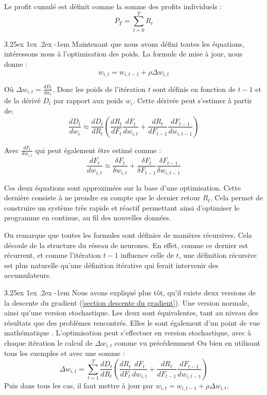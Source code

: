 \documentclass[a4paper, 11pt]{article}
\makeatletter
\renewcommand\paragraph{\@startsection{paragraph}{5}{\z@}%
  {3.25ex \@plus1ex \@minus.2ex}%
  {-1em}%
  {\normalfont\normalsize\bfseries}}
\makeatother
\begin{document}
Le profit cumulé est définit comme la somme des profits individuels :
$$P_T = \sum_{t=0}^T R_t$$

\paragraph{}
Maintenant que nous avons défini toutes les équations, intéressons nous à l'optimisation des poids. La formule de mise à jour, nous donne :
$$w_{i,t} = w_{i,t-1} + \rho \Delta w_{i,t}$$

Où $\Delta w_{i,t} = \frac{dD_t}{dw_i}$. Donc les poids de l'itération $t$ sont définis en fonction de $t-1$ et de la dérivé $D_t$ par rapport aux poids
$w_i$. Cette dérivée peut s'estimer à partir de:
$$\frac{dD_t}{dw_i} \approx \frac{dD_t}{dR_t} (\frac{dR_t}{dF_t} \frac{dF_t}{dw_{i,t}} + \frac{dR_t}{dF_{t-1}} \frac{dF_{t-1}}{dw_{i,t-1}})$$

Avec $\frac{dF_t}{dw_{i,t}}$ qui peut également être estimé comme :
$$\frac{dF_t}{dw_{i,t}} \approx \frac{\delta F_t}{\delta w_{i,t}} + \frac{\delta F_t}{\delta F_{t-1}} \frac{\delta F_{t-1}}{\delta w_{i,t-1}}$$

Ces deux équations sont approximées sur la base d'une optimisation\cite{learning_to_trade}. Cette dernière consiste à ne prendre en compte que le dernier retour $R_t$. Cela permet de construire un système très rapide et réactif permettant ainsi d'optimiser le programme en continue, au fil des nouvelles données.

On remarque que toutes les formules sont définies de manières récursives. Cela découle de la structure du réseau de neurones. En effet, comme ce dernier est
récurrent, et comme l'itération $t-1$ influence celle de $t$, une définition récursive est plus naturelle qu'une définition itérative qui ferait intervenir
des accumulateurs.

\paragraph{}
Nous avons expliqué plus tôt, qu'il existe deux versions de la descente du gradient (\ref{section descente du gradient}). Une version normale, ainsi qu'une
version stochastique.
Les deux sont équivalentes, tant au niveau des résultats que des problèmes rencontrés\cite{learning_to_trade}. Elles le sont également d'un point de vue mathématique
\cite{learning_to_trade}.
L'optimisation peut s'effectuer en version stochastique, avec à chaque itération le calcul de $\Delta w_{i,t}$ comme vu précédemment
Ou bien en utilisant tous les exemples et avec une somme :
$$\Delta w_{i,t} = \sum_{t=1}^T \frac{dD_t}{dR_t} (\frac{dR_t}{dF_t} \frac{dF_t}{dw_{i,t}} + \frac{dR_t}{dF_{t-1}} \frac{dF_{t-1}}{dw_{i,t-1}})$$
Puis dans tous les cas, il faut mettre à jour par $w_{i,t} = w_{i,t-1} + \rho \Delta w_{i,t}$.
\end{document}
